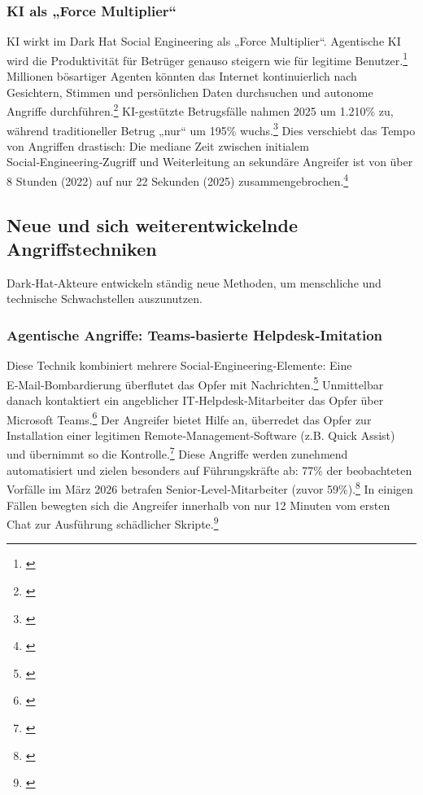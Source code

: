 \documentclass[10pt,a4paper]{article}
\begin{document}
	\subsubsection{KI als „Force Multiplier“}
	KI wirkt im Dark Hat Social Engineering als „Force Multiplier“. Agentische KI wird die Produktivität für Betrüger genauso steigern wie für legitime Benutzer.\footnote{\cite{SecurityWeek2026}} Millionen bösartiger Agenten könnten das Internet kontinuierlich nach Gesichtern, Stimmen und persönlichen Daten durchsuchen und autonome Angriffe durchführen.\footnote{\cite{SecurityWeek2026}} KI-gestützte Betrugsfälle nahmen 2025 um 1.210\% zu, während traditioneller Betrug „nur“ um 195\% wuchs.\footnote{\cite{McAfeeBlog}} Dies verschiebt das Tempo von Angriffen drastisch: Die mediane Zeit zwischen initialem Social‑Engineering‑Zugriff und Weiterleitung an sekundäre Angreifer ist von über 8 Stunden (2022) auf nur 22 Sekunden (2025) zusammengebrochen.\footnote{\cite{AxisStats}}
	
	\subsection{Neue und sich weiterentwickelnde Angriffstechniken}
	Dark‑Hat‑Akteure entwickeln ständig neue Methoden, um menschliche und technische Schwachstellen auszunutzen.
	
	\subsubsection{Agentische Angriffe: Teams‑basierte Helpdesk‑Imitation}
	Diese Technik kombiniert mehrere Social‑Engineering‑Elemente: Eine E‑Mail‑Bombardierung überflutet das Opfer mit Nachrichten.\footnote{\cite{SANSBlog}} Unmittelbar danach kontaktiert ein angeblicher IT‑Helpdesk‑Mitarbeiter das Opfer über Microsoft Teams.\footnote{\cite{SANSBlog}} Der Angreifer bietet Hilfe an, überredet das Opfer zur Installation einer legitimen Remote‑Management‑Software (z.B. Quick Assist) und übernimmt so die Kontrolle.\footnote{\cite{TheHackerNewsUNC6692}} Diese Angriffe werden zunehmend automatisiert und zielen besonders auf Führungskräfte ab: 77\% der beobachteten Vorfälle im März 2026 betrafen Senior‑Level‑Mitarbeiter (zuvor 59\%).\footnote{\cite{ReliaQuestBlackBasta}} In einigen Fällen bewegten sich die Angreifer innerhalb von nur 12 Minuten vom ersten Chat zur Ausführung schädlicher Skripte.\footnote{\cite{ReliaQuestBlackBasta}}
	
\end{document}

